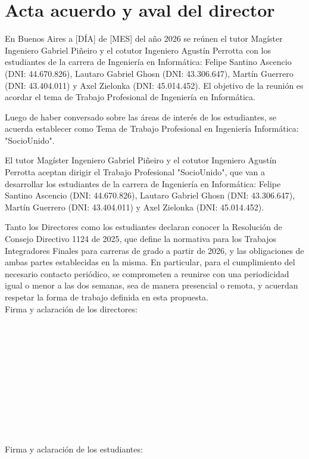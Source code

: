 \section{Acta acuerdo y aval del director}

En Buenos Aires a [DÍA] de [MES] del año 2026 se reúnen el tutor Magíster Ingeniero Gabriel Piñeiro y el cotutor Ingeniero Agustín Perrotta con los estudiantes de la carrera de Ingeniería en Informática: Felipe Santino Ascencio (DNI: 44.670.826), Lautaro Gabriel Ghosn (DNI: 43.306.647), Martín Guerrero (DNI: 43.404.011) y Axel Zielonka (DNI: 45.014.452). El objetivo de la reunión es acordar el tema de Trabajo Profesional de Ingeniería en Informática.

Luego de haber conversado sobre las áreas de interés de los estudiantes, se acuerda establecer como Tema de Trabajo Profesional en Ingeniería Informática: "SocioUnido".

El tutor Magíster Ingeniero Gabriel Piñeiro y el cotutor Ingeniero Agustín Perrotta aceptan dirigir el Trabajo Profesional "SocioUnido", que van a desarrollar los estudiantes de la carrera de Ingeniería en Informática: Felipe Santino Ascencio (DNI: 44.670.826), Lautaro Gabriel Ghosn (DNI: 43.306.647), Martín Guerrero (DNI: 43.404.011) y Axel Zielonka (DNI: 45.014.452).

Tanto los Directores como los estudiantes declaran conocer la Resolución de Consejo Directivo 1124 de 2025, que define la normativa para los Trabajos Integradores Finales para carreras de grado a partir de 2026, y las obligaciones de ambas partes establecidas en la misma. En particular, para el cumplimiento del necesario contacto periódico, se comprometen a reunirse con una periodicidad igual o menor a las dos semanas, sea de manera presencial o remota, y acuerdan respetar la forma de trabajo definida en esta propuesta.
\\

Firma y aclaración de los directores:
\\
\\
\\
\\
\\
\\
\\
\\
\\
\\
\\
\\

Firma y aclaración de los estudiantes:

